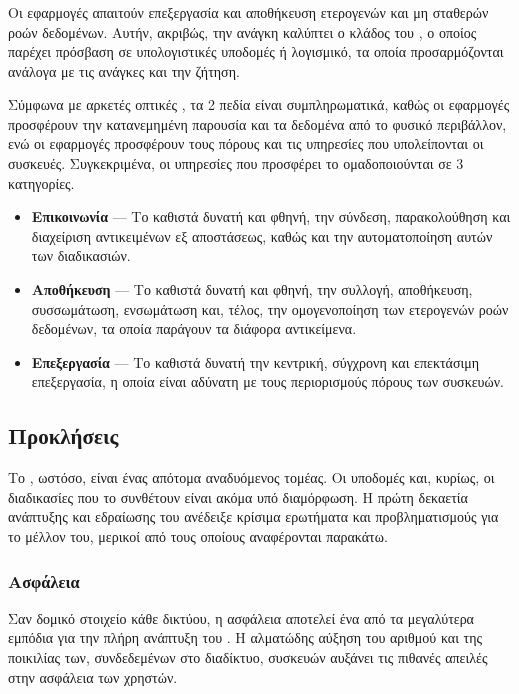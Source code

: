 \subsubsection{}

Οι  εφαρμογές απαιτούν επεξεργασία και αποθήκευση ετερογενών και μη σταθερών ροών δεδομένων.
Αυτήν, ακριβώς, την ανάγκη καλύπτει ο κλάδος του , ο οποίος παρέχει πρόσβαση σε υπολογιστικές υποδομές ή λογισμικό, τα οποία προσαρμόζονται ανάλογα με τις ανάγκες και την ζήτηση.
\par
Σύμφωνα με αρκετές οπτικές \cite{iotcloud1}\cite{iotcloud2}, τα 2 πεδία είναι συμπληρωματικά, καθώς οι  εφαρμογές προσφέρουν την κατανεμημένη παρουσία και τα δεδομένα από το φυσικό περιβάλλον, ενώ οι  εφαρμογές προσφέρουν τους πόρους και τις υπηρεσίες που υπολείπονται οι  συσκευές.
Συγκεκριμένα, οι υπηρεσίες που προσφέρει το  ομαδοποιούνται σε 3 κατηγορίες.
\begin{itemize}
    \item \textbf{Επικοινωνία} --- Το  καθιστά δυνατή και φθηνή, την σύνδεση, παρακολούθηση και διαχείριση αντικειμένων εξ αποστάσεως, καθώς και την αυτοματοποίηση αυτών των διαδικασιών.
    \item \textbf{Αποθήκευση} --- Το  καθιστά δυνατή και φθηνή, την συλλογή, αποθήκευση, συσσωμάτωση, ενσωμάτωση και, τέλος, την ομογενοποίηση των ετερογενών ροών δεδομένων, τα οποία παράγουν τα διάφορα αντικείμενα.
    \item \textbf{Επεξεργασία} --- Το  καθιστά δυνατή την κεντρική, σύγχρονη και επεκτάσιμη επεξεργασία, η οποία είναι αδύνατη με τους περιορισμούς πόρους των  συσκευών.
\end{itemize}
\par

\subsection{Προκλήσεις}
Το , ωστόσο, είναι ένας απότομα αναδυόμενος τομέας.
Οι υποδομές και, κυρίως, οι διαδικασίες που το συνθέτουν είναι ακόμα υπό διαμόρφωση.
Η πρώτη δεκαετία ανάπτυξης και εδραίωσης του  ανέδειξε κρίσιμα ερωτήματα και προβληματισμούς για το μέλλον του, μερικοί από τους οποίους αναφέρονται παρακάτω.
\subsubsection{Ασφάλεια}
Σαν δομικό στοιχείο κάθε δικτύου, η ασφάλεια αποτελεί ένα από τα μεγαλύτερα εμπόδια για την πλήρη ανάπτυξη του  \cite{foster}.
Η αλματώδης αύξηση του αριθμού και της ποικιλίας των, συνδεδεμένων στο διαδίκτυο, συσκευών αυξάνει τις πιθανές απειλές στην ασφάλεια των χρηστών.

